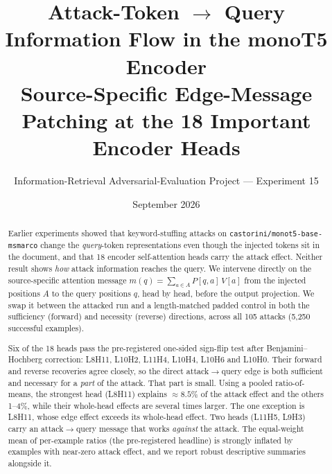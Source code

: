 \documentclass[11pt]{article}
\title{\textbf{Attack-Token $\rightarrow$ Query Information Flow in the monoT5 Encoder} \\[6pt]
\large Source-Specific Edge-Message Patching at the 18 Important Encoder Heads}
\author{Information-Retrieval Adversarial-Evaluation Project --- Experiment 15}
\date{September 2026}
\begin{document}
\maketitle

\begin{abstract}
Earlier experiments showed that keyword-stuffing attacks on
\texttt{castorini/monot5-base-msmarco} change the \emph{query}-token
representations even though the injected tokens sit in the document, and that
18 encoder self-attention heads carry the attack effect. Neither result shows
\emph{how} attack information reaches the query. We intervene directly on the
source-specific attention message
$m(q)=\sum_{a\in A}P[q,a]\,V[a]$ from the injected positions $A$ to the query
positions $q$, head by head, before the output projection. We swap it
between the attacked run and a length-matched padded control in both the
sufficiency (forward) and necessity (reverse) directions, across all 105
attacks (5{,}250 successful examples).

Six of the 18 heads pass the pre-registered one-sided sign-flip test after
Benjamini--Hochberg correction: L8H11, L10H2, L11H4, L10H4, L10H6 and L10H0.
Their forward and reverse recoveries agree closely, so the direct
attack$\rightarrow$query edge is both sufficient and necessary for a
\emph{part} of the attack. That part is small. Using a pooled
ratio-of-means, the strongest head (L8H11) explains $\approx 8.5\%$ of the
attack effect and the others 1--4\%, while their whole-head effects are
several times larger. The one exception is L8H11, whose edge effect exceeds
its whole-head effect. Two heads (L11H5, L9H3) carry an attack$\rightarrow$query
message that works \emph{against} the attack. The equal-weight mean of
per-example ratios (the pre-registered headline) is strongly inflated by
examples with near-zero attack effect, and we report robust descriptive
summaries alongside it.
\end{abstract}
\end{document}
